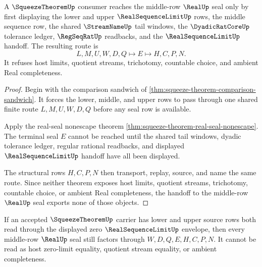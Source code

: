 \begin{theorem}
\label{thm:squeeze-theorem-real-seal-handoff}
A $\SqueezeTheoremUp$ consumer reaches the middle-row $\RealUp$ seal only by first displaying the lower and upper $\RealSequenceLimitUp$ rows, the middle sequence row, the shared $\StreamNameUp$ tail windows, the $\DyadicRatCoreUp$ tolerance ledger, $\RegSeqRatUp$ readbacks, and the $\RealSequenceLimitUp$ handoff. The resulting route is
$$
L,M,U,W,D,Q \longmapsto E \longmapsto H,C,P,N .
$$
It refuses host limits, quotient streams, trichotomy, countable choice, and ambient Real completeness.
\end{theorem}
\begin{proof}
Begin with the comparison sandwich of \autoref{thm:squeeze-theorem-comparison-sandwich}. It forces the lower, middle, and upper rows to pass through one shared finite route $L,M,U,W,D,Q$ before any seal row is available.

Apply the real-seal nonescape theorem \autoref{thm:squeeze-theorem-real-seal-nonescape}. The terminal seal $E$ cannot be reached until the shared tail windows, dyadic tolerance ledger, regular rational readbacks, and displayed $\RealSequenceLimitUp$ handoff have all been displayed.

The structural rows $H,C,P,N$ then transport, replay, source, and name the same route. Since neither theorem exposes host limits, quotient streams, trichotomy, countable choice, or ambient Real completeness, the handoff to the middle-row $\RealUp$ seal exports none of those objects.
\end{proof}

\begin{theorem}
\label{thm:squeeze-theorem-zero-envelope-route}
If an accepted $\SqueezeTheoremUp$ carrier has lower and upper source rows both read through the displayed zero $\RealSequenceLimitUp$ envelope, then every middle-row $\RealUp$ seal still factors through $W,D,Q,E,H,C,P,N$. It cannot be read as host zero-limit equality, quotient stream equality, or ambient completeness.
\end{theorem}

